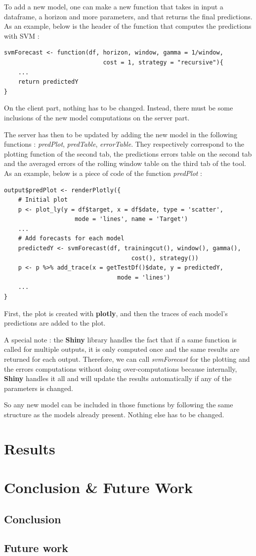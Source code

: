 \documentclass[11pt,a4paper,oneside]{book}
\begin{document}
To add a new model, one can make a new function that takes in input a dataframe, a horizon and more parameters, and that returns the final predictions. As an example, below is the header of the function that computes the predictions with SVM : 

\begin{lstlisting}
svmForecast <- function(df, horizon, window, gamma = 1/window, 
                            cost = 1, strategy = "recursive"){
    ...
    return predictedY
}
\end{lstlisting}


On the client part, nothing has to be changed. Instead, there must be some inclusions of the new model computations on the server part.

The server has then to be updated by adding the new model in the following functions : \textit{predPlot}, \textit{predTable}, \textit{errorTable}. They respectively correspond to the plotting function of the second tab, the predictions errors table on the second tab and the averaged errors of the rolling window table on the third tab of the tool. As an example, below is a piece of code of the function \textit{predPlot} : 

\begin{lstlisting}
output$predPlot <- renderPlotly({
    # Initial plot
    p <- plot_ly(y = df$target, x = df$date, type = 'scatter',
                    mode = 'lines', name = 'Target')
    ...
    # Add forecasts for each model
    predictedY <- svmForecast(df, trainingcut(), window(), gamma(), 
                                    cost(), strategy())
    p <- p %>% add_trace(x = getTestDf()$date, y = predictedY, 
                                mode = 'lines')
    ...
}
\end{lstlisting}

First, the plot is created with \textbf{plotly}, and then the traces of each model's predictions are added to the plot.

A special note : the \textbf{Shiny} library handles the fact that if a same function is called for multiple outputs, it is only computed once and the same results are returned for each output. Therefore, we can call \textit{svmForecast} for the plotting and the errors computations without doing over-computations because internally, \textbf{Shiny} handles it all and will update the results automatically if any of the parameters is changed.

So any new model can be included in those functions by following the same structure as the models already present. Nothing else has to be changed.


\chapter{Results}


\chapter{Conclusion \& Future Work }


\section{Conclusion}


\section{Future work}




\end{document}
